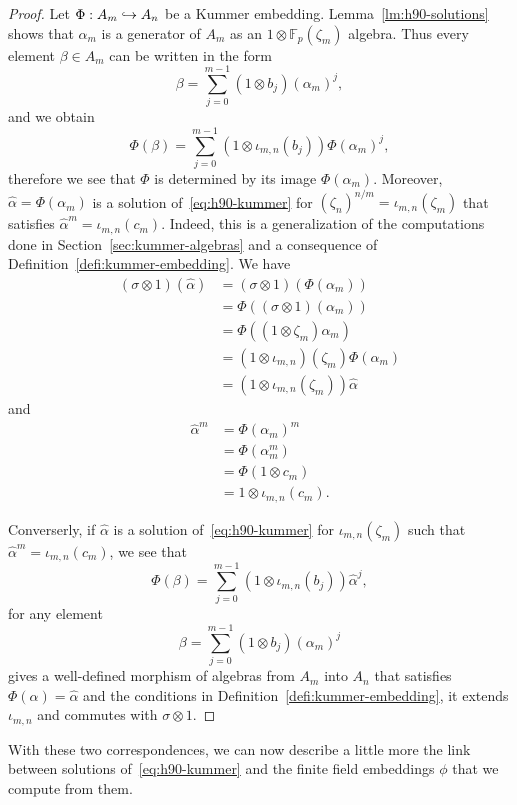\begin{proof}
Let $\Phi:A_m\hookrightarrow A_n$ be a Kummer embedding. Lemma~\ref{lm:h90-solutions} shows
that $\alpha_m$ is a generator of $A_m$ as an $1\otimes\mathbb{F}_{p}(\zeta_m)$
algebra. Thus every element $\beta\in A_m$ can be written in the form
\[
  \beta = \sum_{j=0}^{m-1}(1\otimes b_j)(\alpha_m)^j,
\]
and we obtain
\[
  \Phi(\beta) = \sum_{j=0}^{m-1}(1\otimes\iota_{m, n}(b_j))\Phi(\alpha_m)^j,
\]
therefore we see that $\Phi$ is determined by its image $\Phi(\alpha_m)$. Moreover,
$\hat\alpha=\Phi(\alpha_m)$ is a solution of~\eqref{eq:h90-kummer} for
$(\zeta_n)^{n/m}=\iota_{m,n}(\zeta_m)$ that satisfies
$\hat\alpha^m=\iota_{m, n}(c_m)$. Indeed, this is a generalization of the
computations done in Section~\ref{sec:kummer-algebras} and a consequence of
Definition~\ref{defi:kummer-embedding}. We have
\begin{align*}
 (\sigma\otimes1)(\hat\alpha) &=(\sigma\otimes1)(\Phi(\alpha_m))\\
 &= \Phi( (\sigma\otimes1)(\alpha_m))\\
 &= \Phi((1\otimes\zeta_m)\alpha_m)\\
 &= (1\otimes\iota_{m, n})(\zeta_m)\Phi(\alpha_m)\\
 &= (1\otimes\iota_{m, n}(\zeta_m))\hat\alpha
\end{align*}
and
\begin{align*}
 \hat\alpha^m &= \Phi(\alpha_m)^m\\
 &= \Phi(\alpha_m^m)\\
 &= \Phi(1\otimes c_m)\\
 &= 1\otimes\iota_{m, n}(c_m).
\end{align*}

 Converserly, if $\hat\alpha$ is a solution of~\eqref{eq:h90-kummer} for
 $\iota_{m, n}(\zeta_m)$ such that $\hat\alpha^m=\iota_{m, n}(c_m)$, we see that
 \[
  \Phi(\beta) = \sum_{j=0}^{m-1}(1\otimes\iota_{m, n}(b_j))\hat\alpha^j,
 \]
 for any element
 \[
  \beta = \sum_{j=0}^{m-1}(1\otimes b_j)(\alpha_m)^j
 \]
 gives a well-defined morphism of algebras from  $A_m$ into $A_n$ that satisfies
 $\Phi(\alpha)=\hat\alpha$ and
 the conditions in Definition~\ref{defi:kummer-embedding}, \ie it extends
 $\iota_{m, n}$ and commutes with $\sigma\otimes1$.
\end{proof}
With these two correspondences, we can now describe a little more the link
between solutions of~\eqref{eq:h90-kummer} and the finite field embeddings
$\phi$ that we compute from them.
